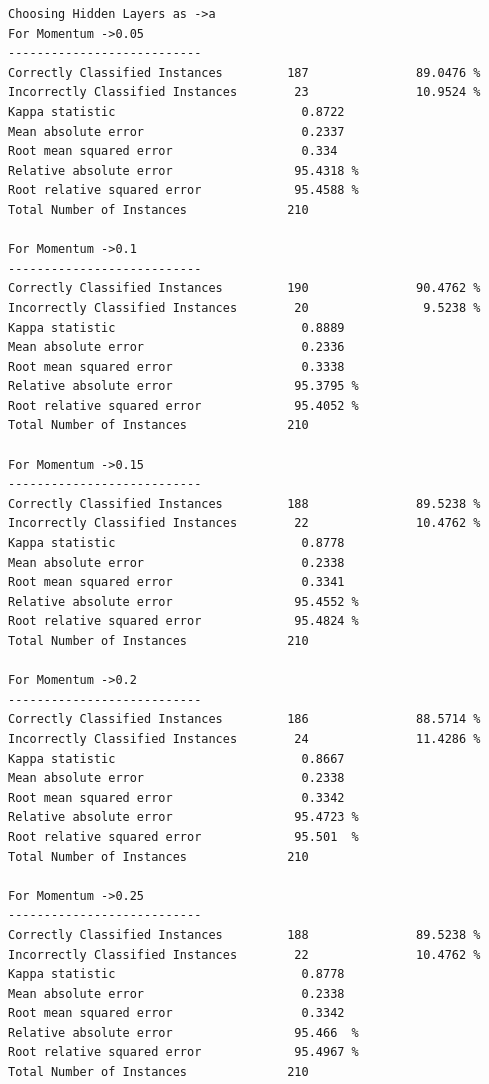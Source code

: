 \documentclass[fontsize=10pt,DIV=14]{scrartcl}
\begin{document}
\begin{itemize}
\begin{verbatim}
Choosing Hidden Layers as ->a
For Momentum ->0.05 
---------------------------
Correctly Classified Instances         187               89.0476 %
Incorrectly Classified Instances        23               10.9524 %
Kappa statistic                          0.8722
Mean absolute error                      0.2337
Root mean squared error                  0.334 
Relative absolute error                 95.4318 %
Root relative squared error             95.4588 %
Total Number of Instances              210     

For Momentum ->0.1 
---------------------------
Correctly Classified Instances         190               90.4762 %
Incorrectly Classified Instances        20                9.5238 %
Kappa statistic                          0.8889
Mean absolute error                      0.2336
Root mean squared error                  0.3338
Relative absolute error                 95.3795 %
Root relative squared error             95.4052 %
Total Number of Instances              210     

For Momentum ->0.15 
---------------------------
Correctly Classified Instances         188               89.5238 %
Incorrectly Classified Instances        22               10.4762 %
Kappa statistic                          0.8778
Mean absolute error                      0.2338
Root mean squared error                  0.3341
Relative absolute error                 95.4552 %
Root relative squared error             95.4824 %
Total Number of Instances              210     

For Momentum ->0.2 
---------------------------
Correctly Classified Instances         186               88.5714 %
Incorrectly Classified Instances        24               11.4286 %
Kappa statistic                          0.8667
Mean absolute error                      0.2338
Root mean squared error                  0.3342
Relative absolute error                 95.4723 %
Root relative squared error             95.501  %
Total Number of Instances              210     

For Momentum ->0.25 
---------------------------
Correctly Classified Instances         188               89.5238 %
Incorrectly Classified Instances        22               10.4762 %
Kappa statistic                          0.8778
Mean absolute error                      0.2338
Root mean squared error                  0.3342
Relative absolute error                 95.466  %
Root relative squared error             95.4967 %
Total Number of Instances              210     


\end{verbatim}
\end{itemize}
\end{document}
